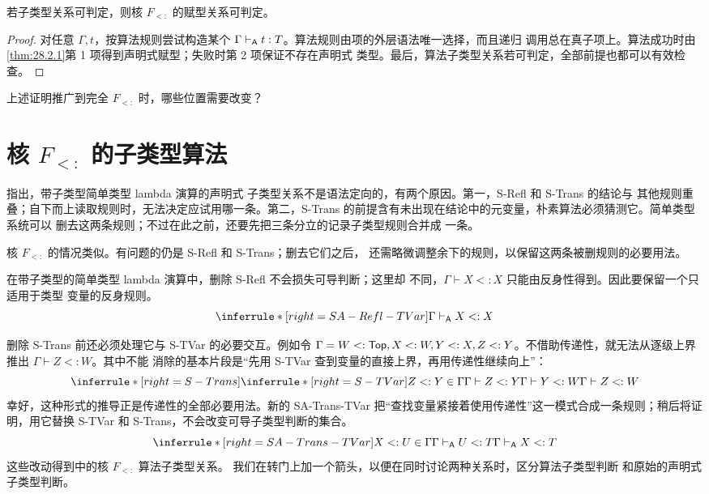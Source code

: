\begin{corollary}[赋型可判定性]
\label{cor:28.2.2}
若子类型关系可判定，则核 \(F_{<:}\) 的赋型关系可判定。
\end{corollary}

\begin{proof}
对任意 \(\Gamma,t\)，按算法规则尝试构造某个
\(\Gamma\mathrel{\vdash_{\mathsf A}} t:T\)。算法规则由项的外层语法唯一选择，而且递归
调用总在真子项上。算法成功时由
\cref{thm:28.2.1}第 1 项得到声明式赋型；失败时第 2 项保证不存在声明式
类型。最后，算法子类型关系若可判定，全部前提也都可以有效检查。
\end{proof}

\begin{exercise}[\(\star\star\)]
\label{ex:28.2.3}
上述证明推广到完全 \(F_{<:}\) 时，哪些位置需要改变？
\end{exercise}

\section{核 \(F_{<:}\) 的子类型算法}
\label{sec:28.3}

指出，带子类型简单类型 lambda 演算的声明式
子类型关系不是语法定向的，有两个原因。第一，S-Refl 和 S-Trans 的结论与
其他规则重叠；自下而上读取规则时，无法决定应试用哪一条。第二，S-Trans
的前提含有未出现在结论中的元变量，朴素算法必须猜测它。简单类型系统可以
删去这两条规则；不过在此之前，还要先把三条分立的记录子类型规则合并成
一条。

核 \(F_{<:}\) 的情况类似。有问题的仍是 S-Refl 和 S-Trans；删去它们之后，
还需略微调整余下的规则，以保留这两条被删规则的必要用法。

在带子类型的简单类型 lambda 演算中，删除 S-Refl 不会损失可导判断；这里却
不同，\(\Gamma\vdash X<:X\) 只能由反身性得到。因此要保留一个只适用于类型
变量的反身规则。
\[
\inferrule*[right=SA-Refl-TVar]{ }
 {\Gamma\algturnstile X<:X}
\]

删除 S-Trans 前还必须处理它与 S-TVar 的必要交互。例如令
\(
\Gamma=W<:\mathsf{Top},X<:W,Y<:X,Z<:Y
\)。不借助传递性，就无法从逐级上界推出 \(\Gamma\vdash Z<:W\)。其中不能
消除的基本片段是“先用 S-TVar 查到变量的直接上界，再用传递性继续向上”：
\[
\inferrule*[right=S-Trans]
 {\inferrule*[right=S-TVar]{Z<:Y\in\Gamma}{\Gamma\vdash Z<:Y}\\
  \Gamma\vdash Y<:W}
 {\Gamma\vdash Z<:W}
\]
幸好，这种形式的推导正是传递性的全部必要用法。新的 SA-Trans-TVar
把“查找变量紧接着使用传递性”这一模式合成一条规则；稍后将证明，用它替换
S-TVar 和 S-Trans，不会改变可导子类型判断的集合。
\[
\inferrule*[right=SA-Trans-TVar]
 {X<:U\in\Gamma\\\Gamma\algturnstile U<:T}
 {\Gamma\algturnstile X<:T}
\]
这些改动得到中的核 \(F_{<:}\) 算法子类型关系。
我们在转门上加一个箭头，以便在同时讨论两种关系时，区分算法子类型判断
和原始的声明式子类型判断。

